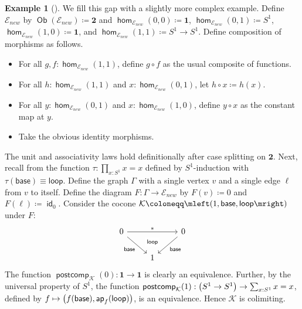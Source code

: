 \documentclass[10pt,a4paper]{article}
\theoremstyle{definition}
\newtheorem{exa}[thm]{Example}
\theoremstyle{remark}
\newcommand{\E}{\mathcal E}
\newcommand{\K}{\mathcal K}
\newcommand{\base}{\mathsf{base}}
\newcommand{\loopp}{\mathsf{loop}}
\newcommand{\0}{\mathbf{0}}
\newcommand{\1}{\mathbf{1}}
\newcommand{\2}{\mathbf{2}}
\DeclareMathOperator{\ap}{\mathsf{ap}}
\DeclareMathOperator{\homm}{\mathsf{hom}}
\DeclareMathOperator{\idd}{\mathsf{id}}
\DeclareMathOperator{\obb}{\mathsf{Ob}}
\DeclareMathOperator{\postcomp}{\mathsf{postcomp}}
\newcommand{\myhref}[2]{%
  \href{#1}{\textcolor{blue!30!black}{#2}}%
}
\begin{document}
\begin{exa}[{\cite[\myhref{https://github.com/PHart3/colimits-agda/blob/lapc-lmcs/HoTT-Agda/core/lib/wild-cats/LAPC-counterexmp.agda}{LAPC-counterexmp}]{2cohagda-pub}}] \label{truecexmp}
We fill this gap with a slightly more complex example. Define $\E_{\textit{new}}$ by $\obb(\E_{\textit{new}}) \coloneqq \2$ and $\homm_{\E_{\textit{new}}}(0,0) \coloneqq \1$, $\homm_{\E_{\textit{new}}}(0,1) \coloneqq S^1$, $\homm_{\E_{\textit{new}}}(1,0) \coloneqq \1$, and $\homm_{\E_{\textit{new}}}(1,1) \coloneqq S^1 \to S^1$. Define composition of morphisms as follows.
\begin{itemize} 
\item For all $g, f : \homm_{\E_{\textit{new}}}(1,1)$, define $g \circ f$ as the usual composite of functions.
\item For all $h : \homm_{\E_{\textit{new}}}(1,1)$ and $x : \homm_{\E_{\textit{new}}}(0,1)$, let  $h \circ x \coloneqq h(x)$.
\item For all $y : \homm_{\E_{\textit{new}}}(0,1)$ and $x : \homm_{\E_{\textit{new}}}(1,0)$, define $y \circ x$ as the constant map at $y$. 
\item Take the obvious identity morphisms.
\end{itemize}
The unit and associativity laws hold definitionally after case splitting on $\2$. Next, recall from \cite[Lemma 6.4.2]{Uni13} the function $\tau : \prod_{x : S^1}x = x$ defined by $S^1$-induction with $\tau(\base) \equiv \loopp$. Define the graph $\Gamma$ with a single vertex $v$ and a single edge $\ell$ from $v$ to itself. Define the diagram $F : \Gamma \to \E_{\textit{new}}$ by $F(v) \coloneqq 0$ and $F(\ell) \coloneqq \idd_0$. Consider the cocone $\K \coloneqq \mleft(1, \base, \loopp\mright)$ under $F$:
\[\begin{tikzcd}
	0 && 0 \\
	& 1
	\arrow[""{name=0, anchor=center, inner sep=0}, "\ast", from=1-1, to=1-3]
	\arrow["{\base}"', from=1-1, to=2-2]
	\arrow["{\base}", from=1-3, to=2-2]
	\arrow["{\loopp}"{description}, draw=none, from=0, to=2-2]
\end{tikzcd}\] The function $\postcomp_{\K}(0) : \1 \to \1$ is clearly an equivalence. Further, by the universal property of $S^1$, the function $\postcomp_{\K}(1) : \mleft(S^1 \to S^1\mright) \to \sum_{x : S^1}x = x$, defined by $f \mapsto \mleft( f(\base), \ap_f(\loopp)\mright)$, is an equivalence. Hence $\K$ is colimiting.


\end{exa}
\end{document}
